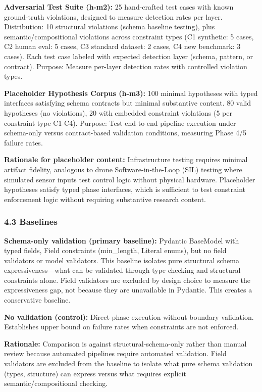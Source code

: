 \textbf{Adversarial Test Suite (h-m2):} 25 hand-crafted test cases with known ground-truth violations, designed to measure detection rates per layer. Distribution: 10 structural violations (schema baseline testing), plus semantic/compositional violations across constraint types (C1 synthetic: 5 cases, C2 human eval: 5 cases, C3 standard dataset: 2 cases, C4 new benchmark: 3 cases). Each test case labeled with expected detection layer (schema, pattern, or contract). Purpose: Measure per-layer detection rates with controlled violation types.

\textbf{Placeholder Hypothesis Corpus (h-m3):} 100 minimal hypotheses with typed interfaces satisfying schema contracts but minimal substantive content. 80 valid hypotheses (no violations), 20 with embedded constraint violations (5 per constraint type C1-C4). Purpose: Test end-to-end pipeline execution under schema-only versus contract-based validation conditions, measuring Phase 4/5 failure rates.

\textbf{Rationale for placeholder content:} Infrastructure testing requires minimal artifact fidelity, analogous to drone Software-in-the-Loop (SIL) testing where simulated sensor inputs test control logic without physical hardware. Placeholder hypotheses satisfy typed phase interfaces, which is sufficient to test constraint enforcement logic without requiring substantive research content.

\subsubsection{4.3 Baselines}

\textbf{Schema-only validation (primary baseline):} Pydantic BaseModel with typed fields, Field constraints (min\_length, Literal enums), but no field validators or model validators. This baseline isolates pure structural schema expressiveness---what can be validated through type checking and structural constraints alone. Field validators are excluded by design choice to measure the expressiveness gap, not because they are unavailable in Pydantic. This creates a conservative baseline.

\textbf{No validation (control):} Direct phase execution without boundary validation. Establishes upper bound on failure rates when constraints are not enforced.

\textbf{Rationale:} Comparison is against structural-schema-only rather than manual review because automated pipelines require automated validation. Field validators are excluded from the baseline to isolate what pure schema validation (types, structure) can express versus what requires explicit semantic/compositional checking.

